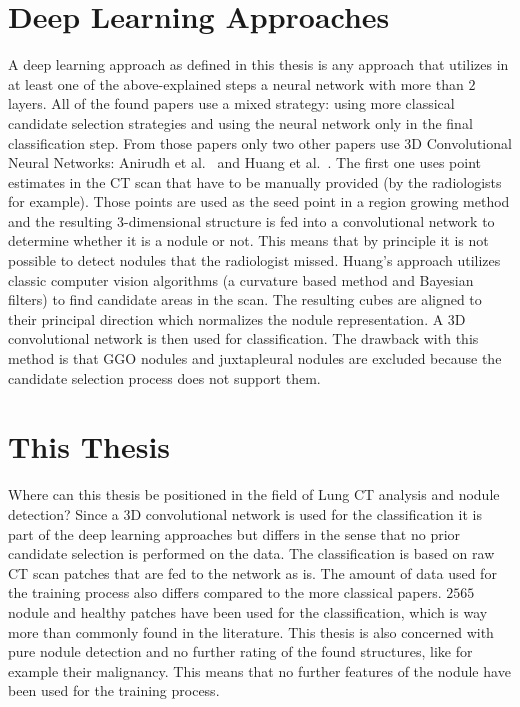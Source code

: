 \documentclass[main.tex]{subfiles}
\begin{document}
\section{Deep Learning Approaches}
A deep learning approach as defined in this thesis is any approach that utilizes in at least one of the above-explained steps a neural network with more than $2$ layers. All of the found papers use a mixed strategy: using more classical candidate selection strategies and using the neural network only in the final classification step. From those papers only two other papers use 3D Convolutional Neural Networks: Anirudh et al.~\cite{anirudh2016lung} and Huang et al.~\cite{huang2017lung}. The first one uses point estimates in the CT scan that have to be manually provided (by the radiologists for example). Those points are used as the seed point in a region growing method and the resulting 3-dimensional structure is fed into a convolutional network to determine whether it is a nodule or not. This means that by principle it is not possible to detect nodules that the radiologist missed. Huang's approach utilizes classic computer vision algorithms (a curvature based method and Bayesian filters) to find candidate areas in the scan. The resulting cubes are aligned to their principal direction which normalizes the nodule representation. A 3D convolutional network is then used for classification. The drawback with this method is that GGO nodules and juxtapleural nodules are excluded because the candidate selection process does not support them.


\section{This Thesis}
Where can this thesis be positioned in the field of Lung CT analysis and nodule detection? Since a 3D convolutional network is used for the classification it is part of the deep learning approaches but differs in the sense that no prior candidate selection is performed on the data. The classification is based on raw CT scan patches that are fed to the network as is. The amount of data used for the training process also differs compared to the more classical papers. $2565$ nodule and healthy patches have been used for the classification, which is way more than commonly found in the literature. This thesis is also concerned with pure nodule detection and no further rating of the found structures, like for example their malignancy. This means that no further features of the nodule have been used for the training process.
\end{document}
